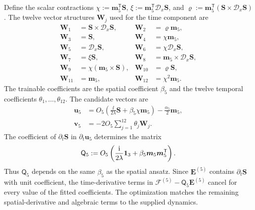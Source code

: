 Define the scalar contractions
$\chi:=\boldsymbol m_5^{\mathsf T}\boldsymbol S$,
$\xi:=\boldsymbol m_5^{\mathsf T}\mathcal D_x\boldsymbol S$, and
$\varrho:=\boldsymbol m_5^{\mathsf T}
(\boldsymbol S\times\mathcal D_x\boldsymbol S)$.
The twelve vector structures $\boldsymbol W_j$ used for the time
component are
\begin{equation}
\begin{aligned}
\boldsymbol W_1&=\boldsymbol S\times\mathcal D_x\boldsymbol S,
&\boldsymbol W_2&=\varrho\boldsymbol m_5,\\
\boldsymbol W_3&=\boldsymbol S,
&\boldsymbol W_4&=\chi\boldsymbol m_5,\\
\boldsymbol W_5&=\mathcal D_x\boldsymbol S,
&\boldsymbol W_6&=\chi\mathcal D_x\boldsymbol S,\\
\boldsymbol W_7&=\xi\boldsymbol S,
&\boldsymbol W_8&=\boldsymbol m_5\times\mathcal D_x\boldsymbol S,\\
\boldsymbol W_9&=\chi(\boldsymbol m_5\times\boldsymbol S),
&\boldsymbol W_{10}&=\varrho\boldsymbol S,\\
\boldsymbol W_{11}&=\boldsymbol m_5,
&\boldsymbol W_{12}&=\chi^2\boldsymbol m_5.
\end{aligned}
\label{eq:ml-class5-features}
\end{equation}
The trainable coefficients are the spatial coefficient $\beta_5$ and
the twelve temporal coefficients $\theta_1,\ldots,\theta_{12}$.
The candidate vectors are
\begin{align}
\boldsymbol u_5
&=O_5\left(\frac{\ii}{2\lambda}\boldsymbol S
 +\beta_5\chi\boldsymbol m_5\right)
 -\frac{\alpha_5}{2}\boldsymbol m_5,
\label{eq:ml-class5-u}\\
\boldsymbol v_5
&=-2O_5\sum_{j=1}^{12}\theta_j\boldsymbol W_j.
\label{eq:ml-class5-v}
\end{align}
The coefficient of $\partial_t\boldsymbol S$ in
$\partial_t\boldsymbol u_5$ determines the matrix
\begin{equation}
\mathsf Q_5
:=O_5\left(\frac{\mathrm{i}}{2\lambda}\mathbf{1}_3
       +\beta_5\boldsymbol m_5\boldsymbol m_5^{\mathsf T}\right).
\label{eq:ml-class5-Q}
\end{equation}
Thus $\mathsf Q_5$ depends on the same $\beta_5$ as the spatial ansatz.
Since $\boldsymbol E^{(5)}$ contains $\partial_t\boldsymbol S$ with unit
coefficient, the time-derivative terms in
$\boldsymbol{\mathcal F}^{(5)}-\mathsf Q_5\boldsymbol E^{(5)}$ cancel
for every value of the fitted coefficients.  The optimization matches the
remaining spatial-derivative and algebraic terms to the supplied dynamics.
